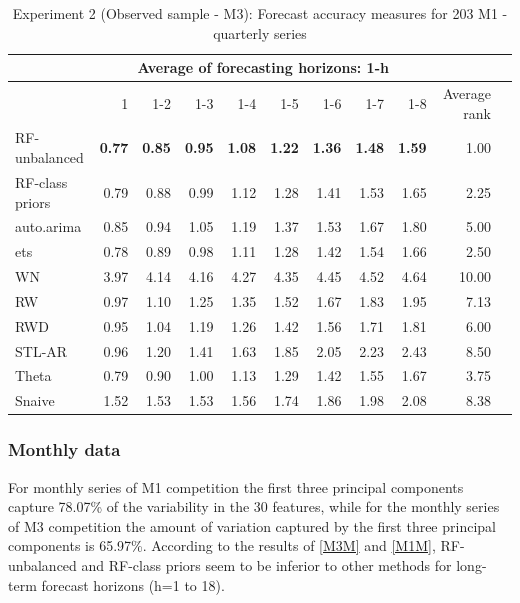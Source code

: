 \documentclass[11pt,]{article}
\theoremstyle{definition}
\theoremstyle{definition}
\theoremstyle{definition}
\theoremstyle{remark}
\begin{document}
\begin{table}[!h]
\centering
\caption{Experiment 2 (Observed sample - M3): Forecast accuracy measures for 203 M1 - quarterly series}
\label{M1Q}
\begin{tabular}{lrrrrrrrrrl}
\hline
 & \multicolumn{8}{c}{Average of forecasting horizons: 1-h}    &  \\ \hline
 &  1& 1-2 & 1-3 & 1-4 & 1-5 & 1-6 & 1-7 & 1-8  & Average rank  \\ \hline
 RF-unbalanced& \bf{0.77} & \bf{0.85} & \bf{0.95} & \bf{1.08} & \bf{1.22} & \bf{1.36} & \bf{1.48} & \bf{1.59} & 1.00  \\ 
RF-class priors & 0.79 &0.88  & 0.99 & 1.12 & 1.28 & 1.41 &  1.53& 1.65 &2.25    \\ 
auto.arima & 0.85 & 0.94 & 1.05 & 1.19 & 1.37 & 1.53& 1.67 & 1.80 & 5.00  \\ 
ets & 0.78 & 0.89  & 0.98 & 1.11 & 1.28 & 1.42 & 1.54 & 1.66 &  2.50  \\
WN & 3.97 & 4.14 & 4.16 & 4.27 & 4.35 & 4.45 & 4.52 & 4.64 & 10.00   \\ 
RW & 0.97 & 1.10 & 1.25 & 1.35 & 1.52 & 1.67 & 1.83 & 1.95 & 7.13  \\ 
RWD & 0.95 & 1.04 & 1.19 & 1.26 & 1.42 & 1.56 & 1.71 & 1.81 &  6.00  \\ 
STL-AR & 0.96 & 1.20 & 1.41 & 1.63 & 1.85 & 2.05 & 2.23 &  2.43 & 8.50   \\ 
Theta & 0.79 & 0.90 & 1.00 & 1.13& 1.29 & 1.42 & 1.55 &  1.67 &  3.75 \\ 
Snaive & 1.52 & 1.53 & 1.53 & 1.56 & 1.74 & 1.86 & 1.98 & 2.08 & 8.38   \\ \hline
\end{tabular}
\end{table}

\newpage

\subsubsection{Monthly data}\label{monthly-data}

For monthly series of M1 competition the first three principal
components capture 78.07\% of the variability in the 30 features, while
for the monthly series of M3 competition the amount of variation
captured by the first three principal components is 65.97\%. According
to the results of \autoref{M3M} and \autoref{M1M}, RF-unbalanced and
RF-class priors seem to be inferior to other methods for long-term
forecast horizons (h=1 to 18).
\end{document}
